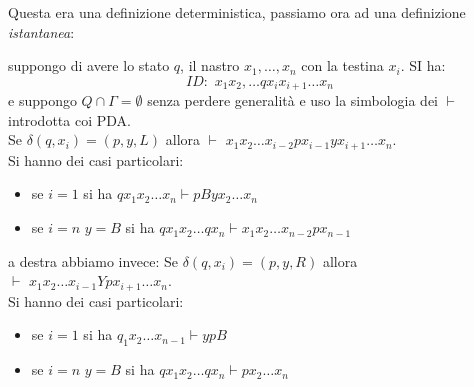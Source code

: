 	\newpage
	Questa era una definizione deterministica, passiamo ora ad una definizione \textit{istantanea}:
	\begin{definition}
		suppongo di avere lo stato $q$, il nastro $x_1,\ldots ,x_n$ con la testina $x_i$. SI ha:
		$$ID:\,\,x_1x_2,\ldots qx_ix_{i+1}\ldots x_n$$
		e suppongo $Q\cap\Gamma=\emptyset$ senza perdere generalità e uso la simbologia dei $\vdash$ introdotta coi PDA. \\
		Se $\delta(q,x_i)=(p,y,L)$ allora $\vdash\,\, x_1x_2\ldots x_{i-2}px_{i-1}yx_{i+1}\ldots x_n$.\\
		Si hanno dei casi particolari:
		\begin{itemize}
			\item se $i=1$ si ha $qx_1x_2\ldots x_n\vdash pByx_2\ldots x_n$
			\item se $i=n\,\,y=B$ si ha $qx_1x_2\ldots qx_n\vdash x_1x_2\ldots x_{n-2}px_{n-1}$
		\end{itemize}
		a destra abbiamo invece:
		Se $\delta(q,x_i)=(p,y,R)$ allora $\vdash\,\, x_1x_2\ldots x_{i-1}Ypx_{i+1}\ldots x_n$.\\
		Si hanno dei casi particolari:
		\begin{itemize}
			\item se $i=1$ si ha $q_1x_2\ldots x_{n-1}\vdash ypB$
			\item se $i=n\,\,y=B$ si ha $qx_1x_2\ldots qx_n\vdash px_2\ldots x_n$
		\end{itemize}
	\end{definition}
